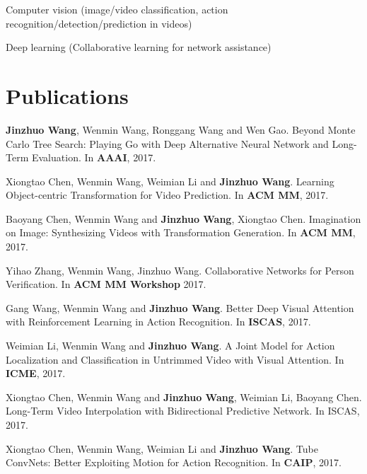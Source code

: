 \documentclass[letterpaper]{article}
\renewenvironment{itemize}{
  \begin{list}{}{
    \setlength{\leftmargin}{1.5em}
  }
}{
  \end{list}
}
\begin{document}
\begin{itemize}
    \item Computer vision (image/video classification, action recognition/detection/prediction in videos)
    \item Deep learning (Collaborative learning for network assistance)
\end{itemize}

\section*{Publications}

\begin{itemize}

\item[1.] \textbf{Jinzhuo Wang}, Wenmin Wang, Ronggang Wang and Wen Gao. Beyond Monte Carlo Tree Search: Playing Go with Deep Alternative Neural Network and Long-Term Evaluation. In \textbf{AAAI}, 2017.

\item[2.] Xiongtao Chen, Wenmin Wang, Weimian Li and \textbf{Jinzhuo Wang}. Learning Object-centric Transformation for Video Prediction. In \textbf{ACM MM}, 2017.

\item[3.] Baoyang Chen, Wenmin Wang and \textbf{Jinzhuo Wang}, Xiongtao Chen. Imagination on Image: Synthesizing Videos with Transformation Generation. In \textbf{ACM MM}, 2017.

\item[4.] Yihao Zhang, Wenmin Wang, Jinzhuo Wang. Collaborative Networks for Person Verification. In \textbf{ACM MM Workshop} 2017.

\item[5.] Gang Wang, Wenmin Wang and \textbf{Jinzhuo Wang}. Better Deep Visual Attention with Reinforcement Learning in Action Recognition. In \textbf{ISCAS}, 2017.

\item[6.] Weimian Li, Wenmin Wang and \textbf{Jinzhuo Wang}. A Joint Model for Action Localization and Classification in Untrimmed Video with Visual Attention. In \textbf{ICME}, 2017.

\item[7.] Xiongtao Chen, Wenmin Wang and \textbf{Jinzhuo Wang}, Weimian Li, Baoyang Chen. Long-Term Video Interpolation with Bidirectional Predictive Network. In ISCAS, 2017.


\item[8.] Xiongtao Chen, Wenmin Wang, Weimian Li and \textbf{Jinzhuo Wang}. Tube ConvNets: Better Exploiting Motion for Action Recognition. In \textbf{CAIP}, 2017.


\end{itemize}
\end{document}
